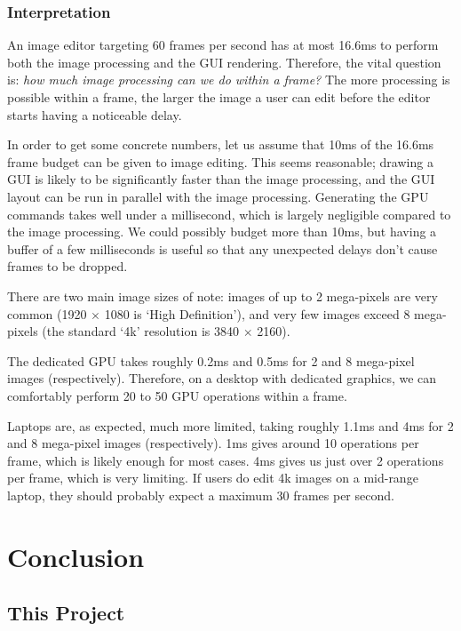 \documentclass[12pt]{article}
\begin{document}
\subsubsection{Interpretation}

An image editor targeting 60 frames per second has at most 16.6ms to perform both the image
processing and the GUI rendering.  Therefore, the vital question is: \emph{how much image processing
can we do within a frame?}  The more processing is possible within a frame, the larger the image a
user can edit before the editor starts having a noticeable delay.

In order to get some concrete numbers, let us assume that 10ms of the 16.6ms frame budget can be
given to image editing.  This seems reasonable; drawing a GUI is likely to be significantly faster
than the image processing, and the GUI layout can be run in parallel with the image processing.
Generating the GPU commands takes well under a millisecond, which is largely negligible compared to
the image processing.  We could possibly budget more than 10ms, but having a buffer of a few
milliseconds is useful so that any unexpected delays don't cause frames to be dropped.

There are two main image sizes of note: images of up to 2 mega-pixels are very common (1920
$\times$ 1080 is `High Definition'), and very few images exceed 8 mega-pixels (the standard `4k'
resolution is 3840 $\times$ 2160).

The dedicated GPU takes roughly 0.2ms and 0.5ms for 2 and 8 mega-pixel images (respectively).
Therefore, on a desktop with dedicated graphics, we can comfortably perform 20 to 50 GPU operations
within a frame.

Laptops are, as expected, much more limited, taking roughly 1.1ms and 4ms for 2 and 8 mega-pixel
images (respectively).  1ms gives around 10 operations per frame, which is likely enough for most
cases.  4ms gives us just over 2 operations per frame, which is very limiting.  If users do edit 4k
images on a mid-range laptop, they should probably expect a maximum 30 frames per second.



\pagebreak

\section{Conclusion}\label{sec:conclusion}

\subsection{This Project}
\end{document}
